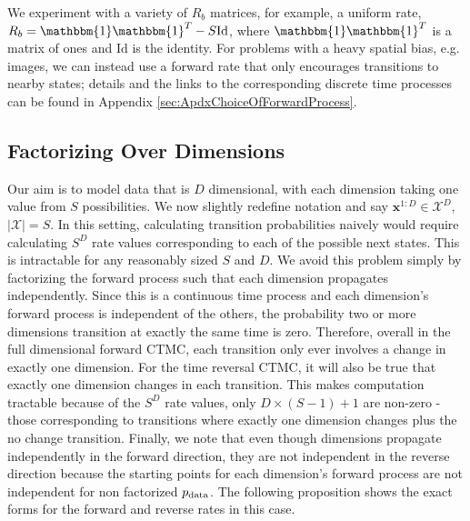 \documentclass{article}
\begin{document}
We experiment with a variety of $R_b$ matrices, for example, a uniform rate, $R_b = \mathbbm{1} \mathbbm{1}^T - S \mathrm{Id}$, where $\mathbbm{1} \mathbbm{1}^T$ is a matrix of ones and $\mathrm{Id}$ is the identity. For problems with a heavy spatial bias, e.g. images, we can instead use a forward rate that only encourages transitions to nearby states; details and the links to the corresponding discrete time processes can be found in Appendix \ref{sec:ApdxChoiceOfForwardProcess}.




\subsection{Factorizing Over Dimensions} \label{sec:FactorizeDim}

Our aim is to model data that is $D$ dimensional, with each dimension taking one value from $S$ possibilities. We now slightly redefine notation and say $\bm{x}^{1:D} \in \mathcal{X}^D$, $|\mathcal{X}| = S$. In this setting, calculating transition probabilities naively would require calculating $S^D$ rate values corresponding to each of the possible next states. This is intractable for any reasonably sized $S$ and $D$. We avoid this problem simply by factorizing the forward process such that each dimension propagates independently. Since this is a continuous time process and each dimension's forward process is independent of the others, the probability two or more dimensions transition at exactly the same time is zero. Therefore, overall in the full dimensional forward CTMC, each transition only ever involves a change in exactly one dimension. For the time reversal CTMC, it will also be true that exactly one dimension changes in each transition. This makes computation tractable because of the $S^D$ rate values, only $D \times (S-1) + 1$ are non-zero - those corresponding to transitions where exactly one dimension changes plus the no change transition. Finally, we note that even though dimensions propagate independently in the forward direction, they are not independent in the reverse direction because the starting points for each dimension's forward process are not independent for non factorized $p_{\textup{data}}$.
The following proposition shows the exact forms for the forward and reverse rates in this case.
\end{document}
